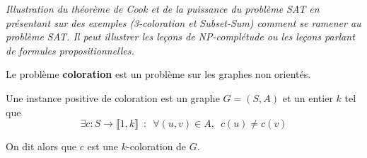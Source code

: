 
\textit{Illustration du théorème de Cook et de la puissance du problème SAT en présentant sur des exemples (3-coloration et Subset-Sum) comment se ramener au problème SAT. Il peut illustrer les leçons de NP-complétude ou les leçons parlant de formules propositionnelles.}

\begin{definition}
	Le problème \textbf{coloration} est un problème sur les graphes non orientés.
	
	Une instance positive de coloration est un graphe $G = (S,A)$ et un entier $k$ tel que
	$$\exists c:S \rightarrow  \llbracket1, k \rrbracket \enspace : \enspace \forall (u,v)\in A, \enspace c(u) \neq c(v)$$

	On dit alors que $c$ est une $k$-coloration de $G$.

\end{definition}


